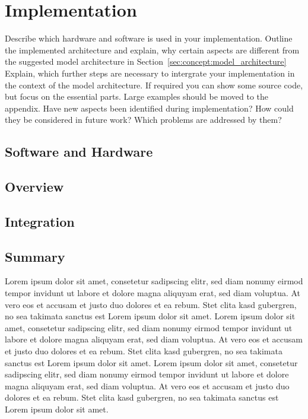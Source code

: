 \chapter{Implementation}
\label{ch:implementation}

Describe which hardware and software is used in your implementation. Outline
the implemented architecture and explain, why certain aspects are different
from the suggested model architecture in Section~\ref{sec:concept:model_architecture}
Explain, which further steps are necessary to intergrate your implementation
in the context of the model architecture. If required you can show some source
code, but focus on the essential parts. Large examples should be moved to the
appendix. Have new aspects been identified during implementation? How could they
be considered in future work? Which problems are addressed by them?

\section{Software and Hardware}
\label{sec:impl:software_and_hardware}


\section{Overview}
\label{sec:impl:overview}


\section{Integration}
\label{sec:impl:integration}


\section{Summary}
\label{sec:impl:summary}

Lorem ipsum dolor sit amet, consetetur sadipscing elitr, sed diam nonumy eirmod tempor invidunt ut labore et dolore magna aliquyam erat, sed diam voluptua. At vero eos et accusam et justo duo dolores et ea rebum. Stet clita kasd gubergren, no sea takimata sanctus est Lorem ipsum dolor sit amet. Lorem ipsum dolor sit amet, consetetur sadipscing elitr, sed diam nonumy eirmod tempor invidunt ut labore et dolore magna aliquyam erat, sed diam voluptua. At vero eos et accusam et justo duo dolores et ea rebum. Stet clita kasd gubergren, no sea takimata sanctus est Lorem ipsum dolor sit amet. Lorem ipsum dolor sit amet, consetetur sadipscing elitr, sed diam nonumy eirmod tempor invidunt ut labore et dolore magna aliquyam erat, sed diam voluptua. At vero eos et accusam et justo duo dolores et ea rebum. Stet clita kasd gubergren, no sea takimata sanctus est Lorem ipsum dolor sit amet.   

